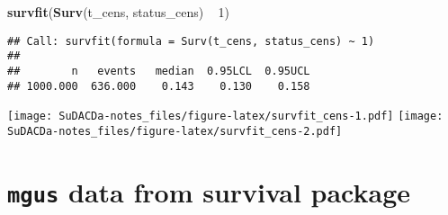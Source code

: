 \documentclass[]{book}
\newenvironment{Shaded}{\begin{snugshade}}{\end{snugshade}}
\newcommand{\KeywordTok}[1]{\textcolor[rgb]{0.13,0.29,0.53}{\textbf{{#1}}}}
\newcommand{\DataTypeTok}[1]{\textcolor[rgb]{0.13,0.29,0.53}{{#1}}}
\newcommand{\DecValTok}[1]{\textcolor[rgb]{0.00,0.00,0.81}{{#1}}}
\newcommand{\FloatTok}[1]{\textcolor[rgb]{0.00,0.00,0.81}{{#1}}}
\newcommand{\StringTok}[1]{\textcolor[rgb]{0.31,0.60,0.02}{{#1}}}
\newcommand{\OtherTok}[1]{\textcolor[rgb]{0.56,0.35,0.01}{{#1}}}
\newcommand{\NormalTok}[1]{{#1}}
\theoremstyle{definition}
\theoremstyle{definition}
\theoremstyle{definition}
\theoremstyle{remark}
\begin{document}
\begin{Shaded}
\begin{Highlighting}[]
\KeywordTok{survfit}\NormalTok{(}\KeywordTok{Surv}\NormalTok{(t_cens, status_cens) ~}\StringTok{ }\DecValTok{1}\NormalTok{)}
\end{Highlighting}
\end{Shaded}

\begin{verbatim}
## Call: survfit(formula = Surv(t_cens, status_cens) ~ 1)
## 
##        n   events   median  0.95LCL  0.95UCL 
## 1000.000  636.000    0.143    0.130    0.158
\end{verbatim}

\begin{Shaded}
\end{Shaded}

\texttt{[image: SuDACDa-notes\_files/figure-latex/survfit\_cens-1.pdf]}
\texttt{[image: SuDACDa-notes\_files/figure-latex/survfit\_cens-2.pdf]}

\section{\texorpdfstring{\texttt{mgus} data from \textbf{survival}
package}{mgus data from survival package}}\label{mgus-data-from-survival-package}
\end{document}
